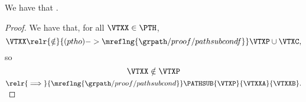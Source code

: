 \begin{proposition}
  We have that \pathsublessprop.%
\end{proposition}

\begin{proof}
  We have that, for all $\VTXX \in \PTH$,
  $$\VTXX \relr {\notin} {(ptho)->\mreflng{\grpath/proof/pathsubcondf}} \VTXP \cup \VTXC,$$
  so
  $$\VTXX \notin \VTXP$$
  $\relr {\implies} {\mreflng{\grpath/proof/pathsubcond}} \PATHSUB{\VTXP}{\VTXXA}{\VTXXB} .$%
\end{proof}
